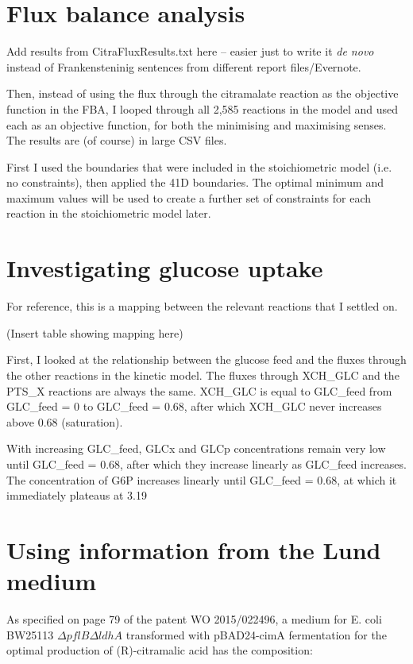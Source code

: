 \documentclass[parskip=full]{scrreprt}
\begin{document}
\section{Flux balance analysis}
\label{sec:fba}

Add results from CitraFluxResults.txt here -- easier just to write it \emph{de novo} instead of Frankensteninig sentences from different report files/Evernote.

Then, instead of using the flux through the citramalate reaction as the objective function in the FBA, I looped through all 2,585 reactions in the model and used each as an objective function, for both the minimising and maximising senses. The results are (of course) in large CSV files.

First I used the boundaries that were included in the stoichiometric model (i.e. no constraints), then applied the 41D boundaries. The optimal minimum and maximum values will be used to create a further set of constraints for each reaction in the stoichiometric model later.

\section{Investigating glucose uptake}
\label{sec:glucoseuptake}

For reference, this is a mapping between the relevant reactions that I settled on.

(Insert table showing mapping here)

First, I looked at the relationship between the glucose feed and the fluxes through the other reactions in the kinetic model. The fluxes through XCH\_GLC and the PTS\_X reactions are always the same. XCH\_GLC is equal to GLC\_feed from GLC\_feed = 0 to GLC\_feed = 0.68, after which XCH\_GLC never increases above 0.68 (saturation).

With increasing GLC\_feed, GLCx and GLCp concentrations remain very low until GLC\_feed = 0.68, after which they increase linearly as GLC\_feed increases. The concentration of G6P increases linearly until GLC\_feed = 0.68, at which it immediately plateaus at 3.19

\section{Using information from the Lund medium}
\label{sec:lund}

As specified on page 79 of the patent WO 2015/022496, a medium for E. coli BW25113 $\Delta{}pflB\Delta{}ldhA$ transformed with pBAD24-cimA fermentation for the optimal production of (R)-citramalic acid has the composition:
\end{document}
